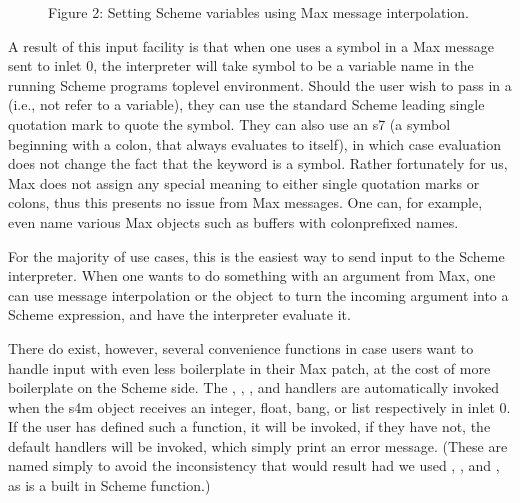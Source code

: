 \documentclass[letterpaper,10pt,english]{sphinxmanual}
\begin{document}
\begin{figure}[htbp]
\centering
\capstart

\noindent{}
\caption{Figure 2: Setting Scheme variables using Max message interpolation.}\label{\detokenize{features_usage:id1}}\end{figure}

\sphinxAtStartPar
A result of this input facility is that when one uses a symbol in a Max message sent to inlet 0, the interpreter will take symbol
to be a variable name in the running Scheme programs top\sphinxhyphen{}level environment.
Should the user wish to pass in a  (i.e., not refer to a variable), they can use the standard Scheme leading single
quotation mark to quote the symbol.
They can also use an s7  (a symbol beginning with a colon, that always evaluates to itself), in which case evaluation
does not change the fact that the keyword is a symbol.
Rather fortunately for us, Max does not assign any special meaning to either single quotation marks or colons, thus this
presents no issue from Max messages.  One can, for example, even name various Max objects such as buffers with colon\sphinxhyphen{}prefixed names.

\sphinxAtStartPar
For the majority of use cases, this is the easiest way to send input to the Scheme interpreter.
When one wants to do something with an argument from Max, one can use message interpolation or the  object
to turn the incoming argument into a Scheme expression, and have the interpreter evaluate it.

\sphinxAtStartPar
There do exist, however, several convenience functions in case users want to handle input with even less boilerplate in their Max patch,
at the cost of more boilerplate on the Scheme side.
The , , , and  handlers are automatically invoked when the s4m object receives an
integer, float, bang, or list respectively in inlet 0.
If the user has defined such a function, it will be invoked, if they have not, the default handlers will be invoked, which
simply print an error message.
(These are named  simply to avoid the inconsistency that would result had we used , , and ,
as  is a built in Scheme function.)
\end{document}
